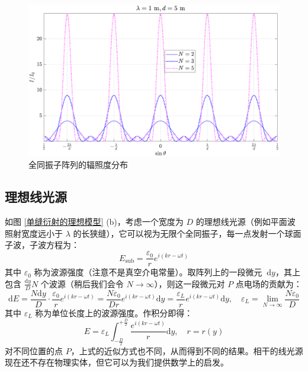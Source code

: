 \documentclass[UTF8]{report}
\theoremstyle{MyLineTheoremStyle} %
\theoremstyle{MyBlockTheoremStyle} %
\theoremstyle{MySubsubsectionStyle} %
\begin{document}
\begin{figure}[H]\centering
\includegraphics[width=0.95\columnwidth]{assets/4/4.2 全同振子.pdf}
\caption{全同振子阵列的辐照度分布}\label{全同振子阵列的辐照度分布}
\end{figure}

\subsection{理想线光源}

如图 \ref{单缝衍射的理想模型} (b)，考虑一个宽度为 $D$ 的理想线光源（例如平面波照射宽度远小于 $\lambda$ 的长狭缝），它可以视为无限个全同振子，每一点发射一个球面子波，子波方程为：
\begin{equation}
E_{\text{sub}} = \frac{\varepsilon_0}{r}e^{i(kr - \omega t)}
\end{equation}
其中 $\varepsilon_0$ 称为波源强度（注意不是真空介电常量）。取阵列上的一段微元 $\ \mathrm{d}y$，其上包含 $\frac{\mathrm{d}y}{D}N$ 个波源（稍后我们会令 $N \to \infty$），则这一段微元对 $P$ 点电场的贡献为：
\begin{equation}
\mathrm{d}E = \frac{N\mathrm{d}y}{D}\cdot \frac{\varepsilon_0}{r}e^{i(kr - \omega t)} = \frac{N\varepsilon_0}{Dr}e^{i(kr - \omega t)} \mathrm{d}y = \frac{\varepsilon_L}{r}e^{i(kr - \omega t)} \mathrm{d}y,\quad \varepsilon_L = \lim_{N\to \infty} \frac{N\varepsilon_0}{D}
\end{equation}
其中 $\varepsilon_L$ 称为单位长度上的波源强度。作积分即得：
\begin{equation}\label{理想线光源积分公式}
E = \varepsilon_L \int_{-\frac{D}{2}}^{+\frac{D}{2}} \frac{e^{i(kr - \omega t)}}{r} \mathrm{d}y,\quad r = r(y)
\end{equation}
对不同位置的点 $P$，上式的近似方式也不同，从而得到不同的结果。相干的线光源现在还不存在物理实体，但它可以为我们提供数学上的启发。
\end{document}
